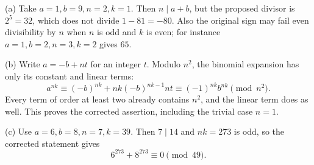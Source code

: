 (a) Take $a=1,b=9,n=2,k=1$. Then $n\mid a+b$, but the proposed divisor is $2^5=32$, which does not divide $1-81=-80$. Also the original sign may fail even divisibility by $n$ when $n$ is odd and $k$ is even; for instance $a=1,b=2,n=3,k=2$ gives $65$.

(b) Write $a=-b+nt$ for an integer $t$. Modulo $n^2$, the binomial expansion has only its constant and linear terms:
\[
a^{nk}\equiv(-b)^{nk}+nk(-b)^{nk-1}nt
\equiv(-1)^{nk}b^{nk}\pmod{n^2}.
\]
Every term of order at least two already contains $n^2$, and the linear term does as well. This proves the corrected assertion, including the trivial case $n=1$.

(c) Use $a=6,b=8,n=7,k=39$. Then $7\mid14$ and $nk=273$ is odd, so the corrected statement gives
\[
\boxed{6^{273}+8^{273}\equiv0\pmod{49}}.
\]
